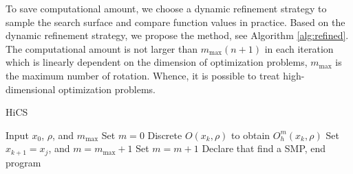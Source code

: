 \documentclass[final,1p,times]{elsarticle}
\begin{document}
To save computational amount, we choose a dynamic
refinement strategy to sample the search surface and compare
function values in practice. 
Based on the dynamic refinement strategy, we propose the
method, see Algorithm \ref{alg:refined}. The computational amount is not
larger than $m_{\max}(n+1)$ in each iteration which is linearly
dependent on the dimension of optimization problems,
$m_{\max}$ is the maximum number of rotation.
Whence, it is possible to treat high-dimensional optimization problems.

\begin{algorithm}[H]
	\caption{HiCS}
	\label{alg:refined}
\begin{algorithmic}[1]
	\STATE Input $x_0$, $\rho$, and $m_{\max}$
		\STATE Set $m=0$
			\STATE Discrete $O(x_k,\rho)$ to obtain $O^m_h(x_k,\rho)$
				\STATE Set $x_{k+1}=x_j$, and $m=m_{\max}+1$
			\ELSE
				\STATE Set $m = m+1$
			\ENDIF
		\ELSE
			\STATE Declare that find a SMP, end program
		\ENDIF
	\ENDFOR
\end{algorithmic}
\end{algorithm}

\end{document}
